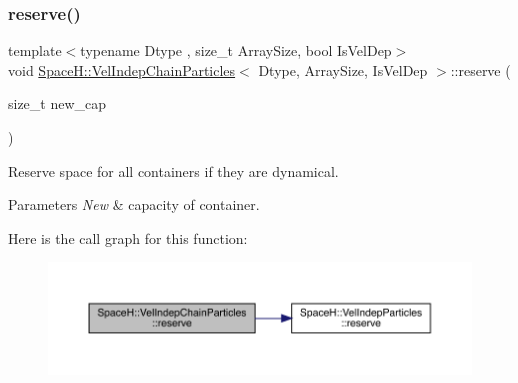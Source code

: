 \subsubsection{\texorpdfstring{reserve()}{reserve()}\hspace{0.1cm}{\footnotesize\ttfamily [2/2]}}
{\footnotesize\ttfamily template$<$typename Dtype , size\+\_\+t Array\+Size, bool Is\+Vel\+Dep$>$ \\
void \mbox{\hyperlink{class_space_h_1_1_vel_indep_chain_particles}{Space\+H\+::\+Vel\+Indep\+Chain\+Particles}}$<$ Dtype, Array\+Size, Is\+Vel\+Dep $>$\+::reserve (\begin{DoxyParamCaption}\item[{size\+\_\+t}]{new\+\_\+cap }\end{DoxyParamCaption})\hspace{0.3cm}{\ttfamily [inline]}}



Reserve space for all containers if they are dynamical. 


\begin{DoxyParams}{Parameters}
{\em New} & capacity of container. \\
\hline
\end{DoxyParams}
Here is the call graph for this function\+:
\nopagebreak
\begin{figure}[H]
\begin{center}
\leavevmode
\includegraphics[width=350pt]{class_space_h_1_1_vel_indep_chain_particles_a9a6b23671b53391cded80cde58b18608_cgraph}
\end{center}
\end{figure}
\mbox{\label{class_space_h_1_1_vel_indep_chain_particles_afdf6136619e4be707bed1e9859bc7171}} 
